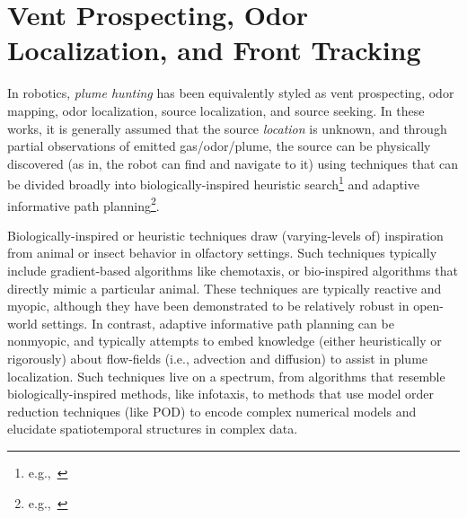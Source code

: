 \section{Vent Prospecting, Odor Localization, and Front Tracking}
In robotics, \emph{plume hunting} has been equivalently styled as vent prospecting, odor mapping, odor localization, source localization, and source seeking. In these works, it is generally assumed that the source \emph{location} is unknown, and through partial observations of emitted gas/odor/plume, the source can be physically discovered (as in, the robot can find and navigate to it) using techniques that can be divided broadly into biologically-inspired heuristic search\footnote{e.g.,~\cite{reddy2022olfactory,chen2019odor}} and adaptive informative path planning\footnote{e.g.,~\cite{salam2019adaptive, jakuba2007stochastic}}.

Biologically-inspired or heuristic techniques draw (varying-levels of) inspiration from animal or insect behavior in olfactory settings. Such techniques typically include gradient-based algorithms like chemotaxis\autocite{morse1998robust}, or bio-inspired algorithms that directly mimic a particular animal\autocite{edwards2001representing,grasso2000biomimetic}. These techniques are typically reactive and myopic, although they have been demonstrated to be relatively robust in open-world settings. In contrast, adaptive informative path planning can be nonmyopic, and typically attempts to embed knowledge (either heuristically or rigorously) about flow-fields (i.e., advection and diffusion) to assist in plume localization. Such techniques live on a spectrum, from algorithms that resemble biologically-inspired methods, like infotaxis\autocite{vergassola2007infotaxis}, to methods that use model order reduction techniques (like POD) to encode complex numerical models and elucidate spatiotemporal structures in complex data\autocite{peng2014dynamic,salam2019adaptive}. 

